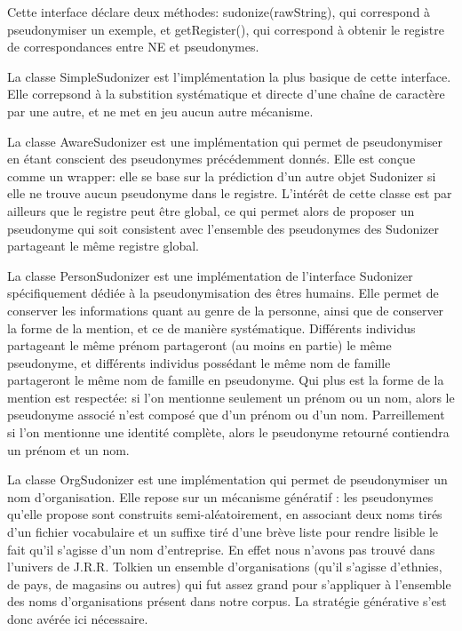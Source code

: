 \documentclass{article}
\begin{document}
Cette interface déclare deux méthodes: sudonize(rawString), qui correspond à pseudonymiser un exemple, et getRegister(), qui correspond à obtenir le registre de correspondances entre NE et pseudonymes.
\par
La classe SimpleSudonizer est l'implémentation la plus basique de cette interface.
Elle correpsond à la substition systématique et directe d'une chaîne de caractère par une autre, et ne met en jeu aucun autre mécanisme.
\par
La classe AwareSudonizer est une implémentation qui permet de pseudonymiser en étant conscient des pseudonymes précédemment donnés.
Elle est conçue comme un wrapper: elle se base sur la prédiction d'un autre objet Sudonizer si elle ne trouve aucun pseudonyme dans le registre.
L'intérêt de cette classe est par ailleurs que le registre peut être global, ce qui permet alors de proposer un pseudonyme qui soit consistent avec l'ensemble des pseudonymes des Sudonizer partageant le même registre global.
\par
La classe PersonSudonizer est une implémentation de l'interface Sudonizer spécifiquement dédiée à la pseudonymisation des êtres humains.
Elle permet de conserver les informations quant au genre de la personne, ainsi que de conserver la forme de la mention, et ce de manière systématique.
Différents individus partageant le même prénom partageront (au moins en partie) le même pseudonyme, et différents individus possédant le même nom de famille partageront le même nom de famille en pseudonyme.
Qui plus est la forme de la mention est respectée: si l'on mentionne seulement un prénom ou un nom, alors le pseudonyme associé n'est composé que d'un prénom ou d'un nom.
Parreillement si l'on mentionne une identité complète, alors le pseudonyme retourné contiendra un prénom et un nom.
\par
La classe OrgSudonizer est une implémentation qui permet de pseudonymiser un nom d'organisation.
Elle repose sur un mécanisme génératif : les pseudonymes qu'elle propose sont construits semi-aléatoirement, en associant deux noms tirés d'un fichier vocabulaire et un suffixe tiré d'une brève liste pour rendre lisible le fait qu'il s'agisse d'un nom d'entreprise.
En effet nous n'avons pas trouvé dans l'univers de J.R.R. Tolkien un ensemble d'organisations (qu'il s'agisse d'ethnies, de pays, de magasins ou autres) qui fut assez grand pour s'appliquer à l'ensemble des noms d'organisations présent dans notre corpus.
La stratégie générative s'est donc avérée ici nécessaire.
\end{document}

